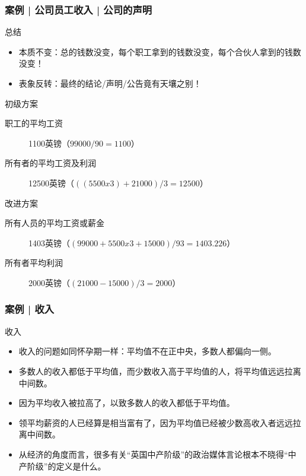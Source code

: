 \begin{frame}
  \frametitle{案例 | 公司员工收入 | 公司的声明}
  \begin{block}{总结}
    \begin{itemize}
      \item 本质不变：总的钱数没变，每个职工拿到的钱数没变，每个合伙人拿到的钱数没变！
      \item 表象反转：最终的结论/声明/公告竟有天壤之别！
    \end{itemize}
  \end{block}
  \pause
  \begin{block}{初级方案}
    \begin{description}
      \item[职工的平均工资] 1100英镑（$99000 / 90 = 1100$）
      \item[所有者的平均工资及利润] 12500英镑（$((5500 x 3) + 21000) / 3 = 12500$）
    \end{description}
  \end{block}
  \pause
  \begin{block}{改进方案}
    \begin{description}
      \item[所有人员的平均工资或薪金] 1403英镑（$(99000 + 5500 x 3 + 15000) / 93 = 1403.226$）
      \item[所有者平均利润] 2000英镑（$(21000 - 15000) / 3 = 2000$）
    \end{description}
  \end{block}
\end{frame}

\begin{frame}
  \frametitle{案例 | 收入}
  \begin{block}{收入}
    \begin{itemize}
      \item 收入的问题如同怀孕期一样：平均值不在正中央，多数人都偏向一侧。
      \item 多数人的收入都低于平均值，而少数收入高于平均值的人，将平均值远远拉离中间数。
      \item 因为平均收入被拉高了，以致多数人的收入都低于平均值。
      \item 领平均薪资的人已经算是相当富有了，因为平均值已经被少数高收入者远远拉离中间数。
      \item 从经济的角度而言，很多有关“英国中产阶级”的政治媒体言论根本不晓得“中产阶级”的定义是什么。
    \end{itemize}
  \end{block}
\end{frame}


